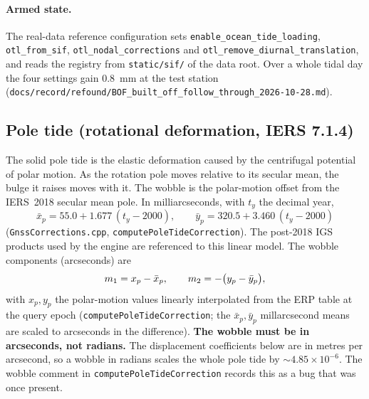 \documentclass[main.tex]{subfiles}
\begin{document}
\paragraph{Armed state.}
The real-data reference configuration sets
\texttt{enable\_ocean\_tide\_loading}, \texttt{otl\_from\_sif},
\texttt{otl\_nodal\_corrections} and \texttt{otl\_remove\_diurnal\_translation},
and reads the registry from \texttt{static/sif/} of the data root.  Over a
whole tidal day the four settings gain \SI{0.8}{\milli\metre} at the test
station
(\texttt{docs/record/refound/BOF\_built\_off\_follow\_through\_2026-10-28.md}).

\subsection{Pole tide (rotational deformation, IERS 7.1.4)}
\label{sec:sitedisp-pt}

The solid pole tide is the elastic deformation caused by the centrifugal
potential of polar motion.  As the rotation pole moves relative to its
secular mean, the bulge it raises moves with it.  The wobble is the
polar-motion offset from the IERS~2018 secular mean pole.  In
milliarcseconds, with $t_y$ the decimal year,
\begin{equation}
\bar{x}_p = 55.0 + 1.677\,(t_y-2000),\qquad
\bar{y}_p = 320.5 + 3.460\,(t_y-2000)
\label{eq:sitedisp-meanpole}
\end{equation}
(\texttt{GnssCorrections.cpp}, \texttt{computePoleTideCorrection}).  The
post-2018 IGS products used by the engine are referenced to this linear
model.  The wobble components (arcseconds) are
\begin{equation}
m_{1} = x_p - \bar{x}_p,\qquad
m_{2} = -\big(y_p - \bar{y}_p\big),
\label{eq:sitedisp-wobble}
\end{equation}
with $x_p,y_p$ the polar-motion values linearly interpolated from the
ERP table at the query epoch
(\texttt{computePoleTideCorrection}; the $\bar{x}_p,\bar{y}_p$
millarcsecond means are scaled to arcseconds in the difference).
\textbf{The wobble must be in arcseconds, not radians.}  The
displacement coefficients below are in metres per arcsecond, so a wobble
in radians scales the whole pole tide by $\sim\!4.85\times10^{-6}$.  The
wobble comment in \texttt{computePoleTideCorrection} records this as a
bug that was once present.
\end{document}
